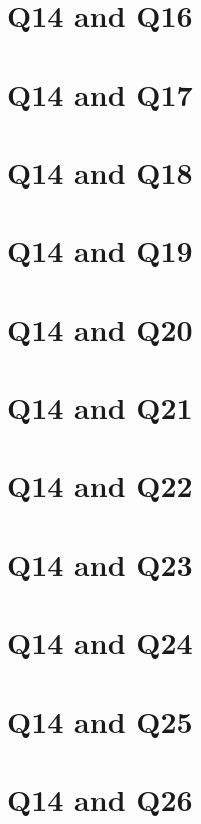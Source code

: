 \documentclass{report}
\begin{document}
\clearpage
\section{Q14 and Q16}


\clearpage
\section{Q14 and Q17}


\clearpage
\section{Q14 and Q18}


\clearpage
\section{Q14 and Q19}


\clearpage
\section{Q14 and Q20}


\clearpage
\section{Q14 and Q21}


\clearpage
\section{Q14 and Q22}


\clearpage
\section{Q14 and Q23}


\clearpage
\section{Q14 and Q24}


\clearpage
\section{Q14 and Q25}


\clearpage
\section{Q14 and Q26}

\end{document}
